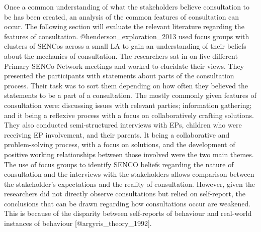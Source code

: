 \documentclass[
]{article}
\begin{document}
Once a common understanding of what the stakeholders believe
consultation to be has been created, an analysis of the common features
of consultation can occur. The following section will evaluate the
relevant literature regarding the features of consultation.
@henderson\_exploration\_2013 used focus groups with clusters of SENCos
across a small LA to gain an understanding of their beliefs about the
mechanics of consultation. The researchers sat in on five different
Primary SENCo Network meetings and worked to elucidate their views. They
presented the participants with statements about parts of the
consultation process. Their task was to sort them depending on how often
they believed the statements to be a part of a consultation. The mostly
commonly given features of consultation were: discussing issues with
relevant parties; information gathering; and it being a reflexive
process with a focus on collaboratively crafting solutions. They also
conducted semi-structured interviews with EPs, children who were
receiving EP involvement, and their parents. It being a collaborative
and problem-solving process, with a focus on solutions, and the
development of positive working relationships between those involved
were the two main themes. The use of focus groups to identify SENCO
beliefs regarding the nature of consultation and the interviews with the
stakeholders allows comparison between the stakeholder's expectations
and the reality of consultation. However, given the researchers did not
directly observe consultations but relied on self-report, the
conclusions that can be drawn regarding how consultations occur are
weakened. This is because of the disparity between self-reports of
behaviour and real-world instances of behaviour
{[}@argyris\_theory\_1992{]}.
\end{document}
